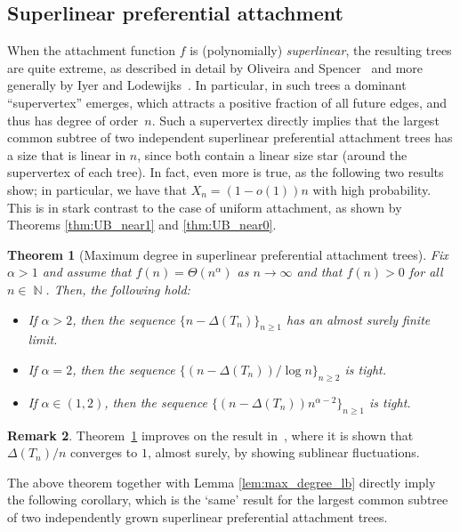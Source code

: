 \documentclass[11pt]{article}
\numberwithin{equation}{section}
\DeclareMathOperator{\N}{\mathbb{N}} %
\newtheorem{theorem}{Theorem}[section]
\theoremstyle{definition}
\newtheorem{remark}[theorem]{Remark}
\begin{document}
\subsection{Superlinear preferential attachment}\label{sec:superlinear}


When the attachment function $f$ is (polynomially) \emph{superlinear}, the resulting trees are quite extreme, as described in detail by Oliveira and Spencer~\cite{oliveira2005connectivity} and more generally by Iyer and Lodewijks~\cite{LodIyer23}. In particular, in such trees a dominant ``supervertex'' emerges, which attracts a positive fraction of all future edges, and thus has degree of order~$n$. 
Such a supervertex directly implies that 
the largest common subtree of two independent superlinear preferential attachment trees has a size that is linear in $n$, 
since both contain a linear size star (around the supervertex of each tree). 
In fact, even more is true, as the following two results show; in particular, we have that $X_{n} = (1-o(1)) n$ with high probability. This is in stark contrast to the case of uniform attachment, as shown by Theorems \ref{thm:UB_near1} and \ref{thm:UB_near0}.


\begin{theorem}[Maximum degree in superlinear preferential attachment trees]\label{thrm:supermax}
    Fix $\alpha>1$ and assume that $f(n)=\Theta(n^\alpha)$ as $n\to\infty$ and that $f(n)>0$ for all $n\in\N$. Then, the following hold:
    \begin{itemize}
        \item If $\alpha>2$, then the sequence $\{n-\Delta(T_n)\}_{n\geq 1}$ has an almost surely finite limit.
        \item If $\alpha=2$, then the sequence $\{(n-\Delta(T_n))/\log n\}_{n\geq 2}$ is tight.
        \item If $\alpha\in(1,2)$, then the sequence $\{(n-\Delta(T_n))n^{\alpha-2}\}_{n\geq 1}$ is tight.
    \end{itemize}
\end{theorem}

\begin{remark}
    Theorem~\ref{thrm:supermax} improves on the result in~\cite[Theorem $9.1$ $(2)$]{SethVenk16}, where it is shown that $\Delta(T_n)/n$ converges to $1$, almost surely, by showing sublinear fluctuations. 
\end{remark}

The above theorem together with Lemma \ref{lem:max_degree_lb} directly imply the following corollary, which is the `same' result for the largest common subtree of two independently grown superlinear preferential attachment trees.
\end{document}
